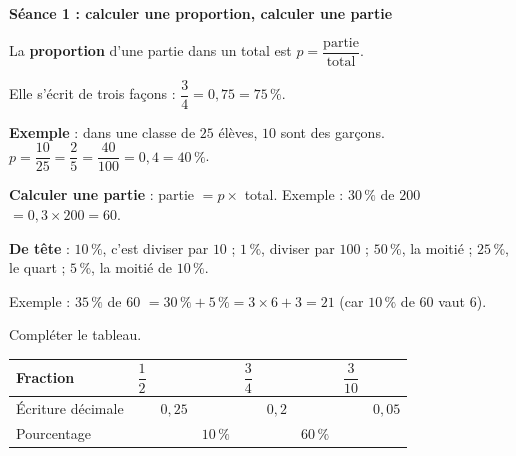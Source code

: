 \documentclass[a4paper,11pt,fleqn]{article}
\renewcommand{\arraystretch}{1.5}
\newcommand{\seance}[1]{{\large\bfseries\textcolor{couleur_theme}{#1}}\par\smallskip}
\begin{document}


\seance{Séance 1 : calculer une proportion, calculer une partie}

\begin{tcolorbox}[colback=white, colframe=couleur_theme, title=\textbf{Rappel : proportion}, fonttitle=\bfseries]
La \textbf{proportion} d'une partie dans un total est \quad $p = \dfrac{\text{partie}}{\text{total}}$.

\smallskip
Elle s'écrit de trois façons : \quad $\dfrac{3}{4} = 0{,}75 = 75\,\%$.

\smallskip
\textbf{Exemple} : dans une classe de $25$ élèves, $10$ sont des garçons. \quad $p = \dfrac{10}{25} = \dfrac{2}{5} = \dfrac{40}{100} = 0{,}4 = 40\,\%$.

\smallskip
\textbf{Calculer une partie} : \quad partie $= p \times$ total. \quad Exemple : $30\,\%$ de $200$ \quad $= 0{,}3 \times 200 = 60$.

\smallskip
\textbf{De tête} : $10\,\%$, c'est diviser par $10$ ; \quad $1\,\%$, diviser par $100$ ; \quad $50\,\%$, la moitié ; \quad $25\,\%$, le quart ; \quad $5\,\%$, la moitié de $10\,\%$.

Exemple : $35\,\%$ de $60$ \quad $= 30\,\% + 5\,\% = 3 \times 6 + 3 = 21$ \quad (car $10\,\%$ de $60$ vaut $6$).
\end{tcolorbox}

\begin{EXO}{}{}
Compléter le tableau.

\begin{center}
\renewcommand{\arraystretch}{1}
\begin{tabular}{|>{\rule[-2.4ex]{0pt}{6.6ex}}l|*{8}{w{c}{1.4cm}|}}
	\hline
	Fraction & $\dfrac{1}{2}$ & & & $\dfrac{3}{4}$ & & & $\dfrac{3}{10}$ & \\ \hline
	Écriture décimale & & $0{,}25$ & & & $0{,}2$ & & & $0{,}05$ \\ \hline
	Pourcentage & & & $10\,\%$ & & & $60\,\%$ & & \\ \hline
\end{tabular}
\end{center}
\end{EXO}
\end{document}
